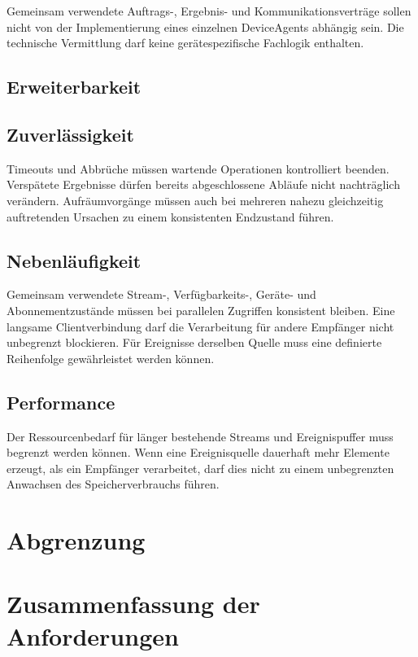 Gemeinsam verwendete Auftrags-, Ergebnis- und Kommunikationsverträge sollen nicht von der Implementierung eines einzelnen DeviceAgents abhängig sein. Die technische Vermittlung darf keine gerätespezifische Fachlogik enthalten.

\subsection{Erweiterbarkeit}

\subsection{Zuverlässigkeit}

Timeouts und Abbrüche müssen wartende Operationen kontrolliert beenden. Verspätete Ergebnisse dürfen bereits abgeschlossene Abläufe nicht nachträglich verändern. Aufräumvorgänge müssen auch bei mehreren nahezu gleichzeitig auftretenden Ursachen zu einem konsistenten Endzustand führen.

\subsection{Nebenläufigkeit}

Gemeinsam verwendete Stream-, Verfügbarkeits-, Geräte- und Abonnementzustände müssen bei parallelen Zugriffen konsistent bleiben. Eine langsame Clientverbindung darf die Verarbeitung für andere Empfänger nicht unbegrenzt blockieren. Für Ereignisse derselben Quelle muss eine definierte Reihenfolge gewährleistet werden können.

\subsection{Performance}

Der Ressourcenbedarf für länger bestehende Streams und Ereignispuffer muss begrenzt werden können. Wenn eine Ereignisquelle dauerhaft mehr Elemente erzeugt, als ein Empfänger verarbeitet, darf dies nicht zu einem unbegrenzten Anwachsen des Speicherverbrauchs führen.

\section{Abgrenzung}

\section{Zusammenfassung der Anforderungen}

